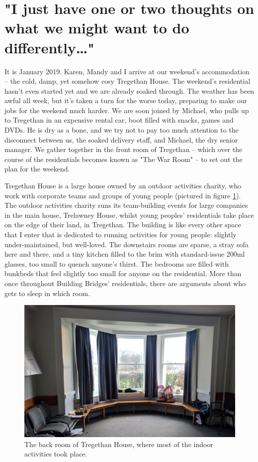 \section{"I just have one or two thoughts on what we might want to do differently…"}
It is January 2019. Karen, Mandy and I arrive at our weekend’s accommodation – the cold, damp, yet somehow cosy Tregethan House. The weekend's residential hasn’t even started yet and we are already soaked through. The weather has been awful all week, but it's taken a turn for the worse today, preparing to make our jobs for the weekend much harder. We are soon joined by Michael, who pulls up to Tregethan in an expensive rental car, boot filled with snacks, games and DVDs. He is dry as a bone, and we try not to pay too much attention to the disconnect between us, the soaked delivery staff, and Michael, the dry senior manager. We gather together in the front room of Tregethan – which over the course of the residentials becomes known as "The War Room" – to set out the plan for the weekend.

Tregethan House is a large house owned by an outdoor activities charity,  who work with corporate teams and groups of young people (pictured in figure \ref{fig:tregethan}). The outdoor activities charity runs its team-building events for large companies in the main house, Trelawney House, whilst young peoples' residentials take place on the edge of their land, in Tregethan. The building is like every other space that I enter that is dedicated to running activities for young people: slightly under-maintained, but well-loved. The downstairs rooms are sparse, a stray sofa here and there, and a tiny kitchen filled to the brim with standard-issue 200ml glasses, too small to quench anyone's thirst. The bedrooms are filled with bunkbeds that feel slightly too small for anyone on the residential. More than once throughout Building Bridges' residentials, there are arguments about who gets to sleep in which room. 

\begin{figure}
    \centering
    \includegraphics[width=1\linewidth]{Images/2/tregethan.png}
    \caption{The back room of Tregethan House, where most of the indoor activities took place.}
    \label{fig:tregethan}
\end{figure}

